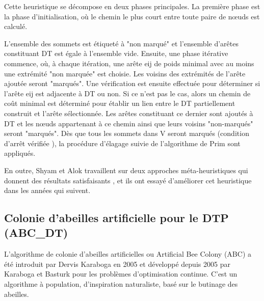 Cette heuristique se décompose en deux phases principales. La première phase est la phase d’initialisation, où le chemin le plus court entre toute paire de nœuds est calculé.

L’ensemble des sommets est étiqueté à "non marqué" et l’ensemble d’arêtes constituant DT est égale à l’ensemble vide. Ensuite, une phase itérative commence, où, à chaque itération, une arête eij de poids minimal avec au moins une extrémité "non marquée" est choisie. Les voisins des extrémités de l’arête ajoutée seront "marqués". Une vérification est ensuite effectuée pour déterminer si l’arête eij est adjacente à DT ou non. Si ce n’est pas le cas, alors un chemin de coût minimal est déterminé pour établir un lien entre le DT partiellement construit et l’arête sélectionnée. Les arêtes constituant ce dernier sont ajoutés à DT et les nœuds appartenant à ce chemin ainsi que leurs voisins "non-marqués" seront "marqués". Dès que tous les sommets dans V seront marqués (condition d’arrêt vérifiée ), la procédure d’élagage suivie de l’algorithme de Prim  sont appliqués.   
    
En outre, Shyam et Alok travaillent sur deux approches méta-heuristiques qui donnent des résultats satisfaisants , et ils ont essayé d’améliorer cet heuristique dans les années qui suivent.

\subsection{Colonie d'abeilles artificielle pour le DTP (ABC\_DT)}
L’algorithme de colonie d’abeilles artificielles ou Artificial Bee Colony (ABC) a été introduit par Dervis Karaboga en 2005 \cite{karaboga2005idea} et développé depuis 2005 par Karaboga et Basturk \cite{karaboga2008performance} pour les problèmes d’optimisation continue. C’est un algorithme à population, d’inspiration naturaliste, basé sur le butinage des abeilles.


